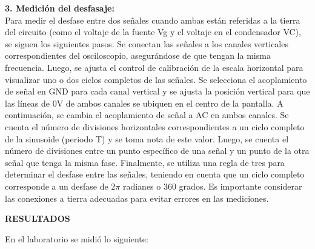 \documentclass[12pt]{article}
\begin{document}
        \textbf{3. Medición del desfasaje:}\\
        
        Para medir el desfase entre dos señales cuando ambas están referidas a la tierra del circuito (como el voltaje de la fuente Vg y el voltaje en el condensador VC), se siguen los siguientes pasos. Se conectan las señales a los canales verticales correspondientes del osciloscopio, asegurándose de que tengan la misma frecuencia. Luego, se ajusta el control de calibración de la escala horizontal para visualizar uno o dos ciclos completos de las señales. Se selecciona el acoplamiento de señal en GND para cada canal vertical y se ajusta la posición vertical para que las líneas de 0V de ambos canales se ubiquen en el centro de la pantalla. A continuación, se cambia el acoplamiento de señal a AC en ambos canales. Se cuenta el número de divisiones horizontales correspondientes a un ciclo completo de la sinusoide (periodo T) y se toma nota de este valor. Luego, se cuenta el número de divisiones entre un punto específico de una señal y un punto de la otra señal que tenga la misma fase. Finalmente, se utiliza una regla de tres para determinar el desfase entre las señales, teniendo en cuenta que un ciclo completo corresponde a un desfase de $2\pi$ radianes o 360 grados. Es importante considerar las conexiones a tierra adecuadas para evitar errores en las mediciones.
	
	\newpage
	
	\begin{center}
		\textbf{\large RESULTADOS}\\
	\end{center}
	
	\noindent En el laboratorio se midió lo siguiente:
	
\end{document}
